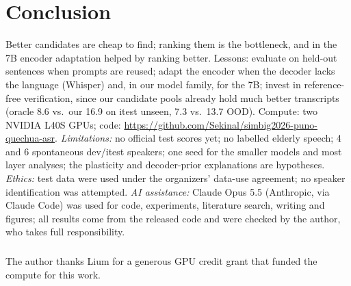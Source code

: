 \documentclass[runningheads]{llncs}
\begin{document}
\section{Conclusion}
Better candidates are cheap to find; ranking them is the bottleneck, and in the 7B encoder
adaptation helped by ranking better. Lessons: evaluate on held-out sentences when prompts are
reused; adapt the encoder when the decoder lacks the language (Whisper) and, in our model family,
for the 7B; invest in reference-free verification, since our candidate pools already hold much
better transcripts (oracle 8.6 vs.\ our 16.9 on itest unseen, 7.3 vs.\ 13.7 OOD). Compute: two NVIDIA L40S
GPUs; code: \url{https://github.com/Sekinal/simbig2026-puno-quechua-asr}. \emph{Limitations:} no official test scores yet; no labelled elderly speech; 4
and 6 spontaneous dev/itest speakers; one seed for the smaller models and most layer analyses;
the plasticity and decoder-prior explanations are hypotheses. \emph{Ethics:} test data were used under the organizers' data-use agreement; no
speaker identification was attempted. \emph{AI assistance:} Claude Opus 5.5 (Anthropic, via
Claude Code) was used for code, experiments, literature search, writing and figures; all results
come from the released code and were checked by the author, who takes full responsibility.

\begin{credits}
\subsubsection{\ackname} The author thanks Lium for a generous GPU credit grant that funded the
compute for this work.
\end{credits}



\end{document}
